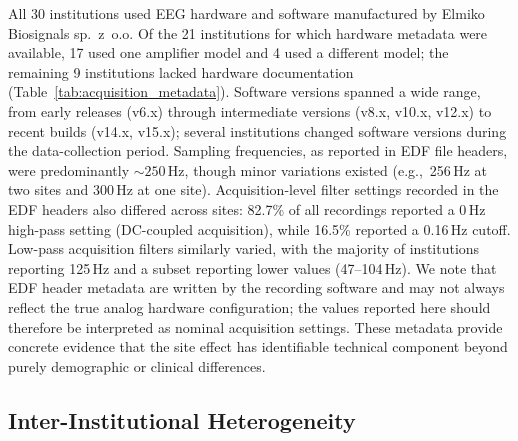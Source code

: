 \documentclass[preprint,12pt]{elsarticle}
\begin{document}
All 30 institutions used EEG hardware and software manufactured by
Elmiko Biosignals sp.~z~o.o.
Of the 21 institutions for which hardware metadata were available,
17 used one amplifier model and 4 used a different model;
the remaining 9 institutions lacked hardware documentation
(Table~\ref{tab:acquisition_metadata}).
Software versions spanned a wide range, from early releases (v6.x)
through intermediate versions (v8.x, v10.x, v12.x) to recent builds
(v14.x, v15.x); several institutions changed software versions during
the data-collection period.
Sampling frequencies, as reported in EDF file headers, were
predominantly ${\sim}250$\,Hz, though minor variations existed
(e.g.,\ 256\,Hz at two sites and 300\,Hz at one site).
Acquisition-level filter settings recorded in the EDF headers also
differed across sites: 82.7\% of all recordings reported a 0\,Hz
high-pass setting (DC-coupled acquisition), while 16.5\% reported a
0.16\,Hz cutoff.
Low-pass acquisition filters similarly varied, with the majority of
institutions reporting 125\,Hz and a subset reporting lower values
(47--104\,Hz).
We note that EDF header metadata are written by the recording software
and may not always reflect the true analog hardware configuration;
the values reported here should therefore be interpreted as nominal
acquisition settings.
These metadata provide concrete evidence that the site effect has
identifiable technical component beyond purely demographic or clinical
differences.

\subsection{Inter-Institutional Heterogeneity}
\label{subsec:exploratory}
\end{document}
